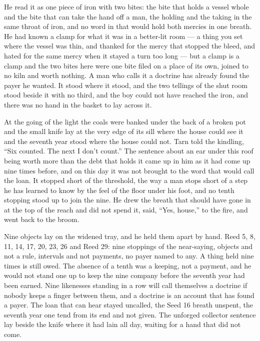 He read it as one piece of iron with two bites: the bite that holds a vessel whole and the bite that can take the hand off a man, the holding and the taking in the same throat of iron, and no word in  that would hold both mercies in one breath. He had known a clamp for what it was in a better-lit room --- a thing you set where the vessel was thin, and thanked for the mercy that stopped the bleed, and hated for the same mercy when it stayed a turn too long --- but a clamp is a clamp and the two bites here were one bite filed on a place of its own, joined to no kiln and worth nothing. A man who calls it a doctrine has already found the payer he wanted. It stood where it stood, and the two tellings of the shut room stood beside it with no third, and the boy could not have reached the iron, and there was no hand in the basket to lay across it.

At the going of the light the coals were banked under the back of a broken pot and the small knife lay at the very edge of its sill where the house could see it and the seventh year stood where the house could not. Tarn told the kindling, “Six counted. The next I don't count.” The sentence about an ear under this roof being worth more than the debt that holds it came up in him as it had come up nine times before, and on this day it was not brought to the word that would call the loan. It stopped short of the threshold, the way a man stops short of a step he has learned to know by the feel of the floor under his foot, and no tenth stopping stood up to join the nine. He drew the breath that should have gone in at the top of the reach and did not spend it, said, “Yes, house,” to the fire, and went back to the broom.

Nine objects lay on the widened tray, and he held them apart by hand. Reed 5, 8, 11, 14, 17, 20, 23, 26 and Reed 29: nine stoppings of the near-saying, objects and not a rule, intervals and not payments, no payer named to any. A thing held nine times is still owed. The absence of a tenth was a keeping, not a payment, and he would not stand one up to keep the nine company before the seventh year had been earned. Nine likenesses standing in a row will call themselves a doctrine if nobody keeps a finger between them, and a doctrine is an account that has found a payer. The loan that can hear stayed uncalled, the Seed 16 breath unspent, the seventh year one tend from its end and not given. The unforged collector sentence lay beside the knife where it had lain all day, waiting for a hand that did not come.

